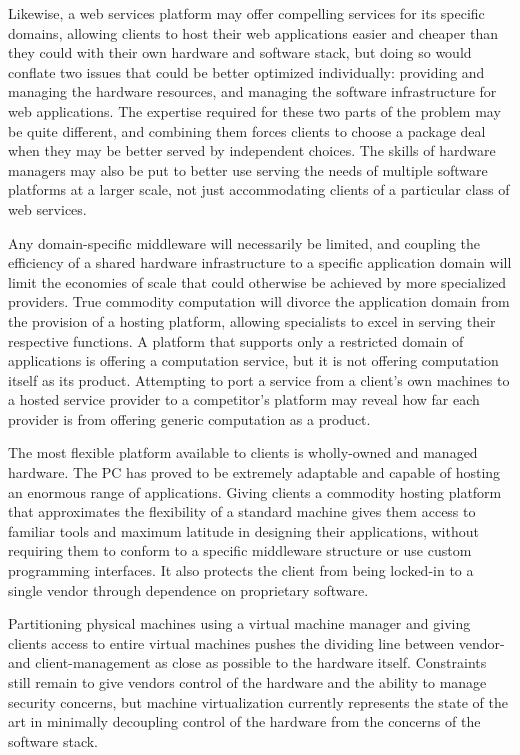 Likewise, a web services platform may offer compelling services for its specific domains, allowing clients to host their web applications easier and cheaper than they could with their own hardware and software stack, but doing so would conflate two issues that could be better optimized individually: providing and managing the hardware resources, and managing the software infrastructure for web applications. The expertise required for these two parts of the problem may be quite different, and combining them forces clients to choose a package deal when they may be better served by independent choices. The skills of hardware managers may also be put to better use serving the needs of multiple software platforms at a larger scale, not just accommodating clients of a particular class of web services.

Any domain-specific middleware will necessarily be limited, and coupling the efficiency of a shared hardware infrastructure to a specific application domain will limit the economies of scale that could otherwise be achieved by more specialized providers. True commodity computation will divorce the application domain from the provision of a hosting platform, allowing specialists to excel in serving their respective functions. A platform that supports only a restricted domain of applications is offering a computation service, but it is not offering computation itself as its product. Attempting to port a service from a client's own machines to a hosted service provider to a competitor's platform may reveal how far each provider is from offering generic computation as a product.

The most flexible platform available to clients is wholly-owned and managed hardware. The PC has proved to be extremely adaptable and capable of hosting an enormous range of applications. Giving clients a commodity hosting platform that approximates the flexibility of a standard machine gives them access to familiar tools and maximum latitude in designing their applications, without requiring them to conform to a specific middleware structure or use custom programming interfaces. It also protects the client from being locked-in to a single vendor through dependence on proprietary software.

Partitioning physical machines using a virtual machine manager and giving clients access to entire virtual machines pushes the dividing line between vendor- and client-management as close as possible to the hardware itself. Constraints still remain to give vendors control of the hardware and the ability to manage security concerns, but machine virtualization currently represents the state of the art in minimally decoupling control of the hardware from the concerns of the software stack.

